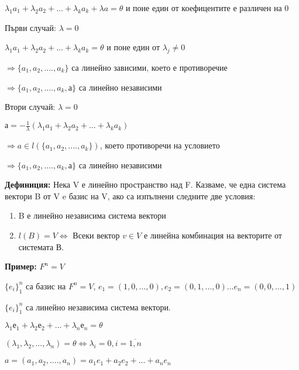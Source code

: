 \documentclass[fleqn,12pt]{article}
\begin{document}
\begin{flushleft}
    $ \lambda_1 a_1 + \lambda_2 a_2 + ... + \lambda_k a_k + \lambda a = \theta $ и поне един от коефицентите е различен на 0

    \vspace{5mm}
    
    Първи случай: $\lambda = 0 $

    $ \lambda_1 a_1 + \lambda_2 a_2 + ... + \lambda_k a_k = \theta $ и поне един от $\lambda_j \neq 0 $

    $ \Rightarrow \{a_1, a_2, ...., a_k\} $ са линейно зависими, което е противоречие
    
    $ \Rightarrow \{a_1, a_2, ...., a_k, а\} $ са линейно независими

    \vspace{5mm}
    
    Втори случай: $\lambda = 0 $

    $ а = - \frac{1}{\lambda} ( \lambda_1 a_1 + \lambda_2 a_2 + ... + \lambda_k a_k ) $ 

    $ \Rightarrow a \in l(\{a_1, a_2, ...., a_k\}) $, което противоречи на условието
    
    $ \Rightarrow \{a_1, a_2, ...., a_k, а\} $ са линейно независими

    
    \vspace{5mm}
    
    \textbf{Дефиниция:} Нека V е линейно пространство над F. Казваме, че една система вектори B от V e базис на V, ако са изпълнени следните две условия:

    \begin{enumerate}
        \item B е линейно независима система вектори
        \item $l(B) = V \Leftrightarrow $ Всеки вектор $ v \in V $ е линейна комбинация на векторите от системата В.
    \end{enumerate}

        \textbf{Пример:} $ F^n = V $

        $\{ e_i\}_1^n $ са базис на $ F^n = V $, $ e_1 = (1, 0, ..., 0), e_2 = (0, 1, ..., 0) ... e_n = (0, 0, ..., 1)$

        $ \{ e_i\}_1^n $ са линейно независима система вектори.

        $ \lambda_1 е_1 + \lambda_2 е_2 + ... + \lambda_n е_n = \theta $

        $ (\lambda_1, \lambda_2, ..., \lambda_n) = \theta \Leftrightarrow \lambda_i = 0, i = \overline{1,n}$

        $ a = (a_1, a_2, ...., a_n) = a_1 e_1 + a_2 e_2 + ... + a_n e_n $


\end{flushleft}
\end{document}
